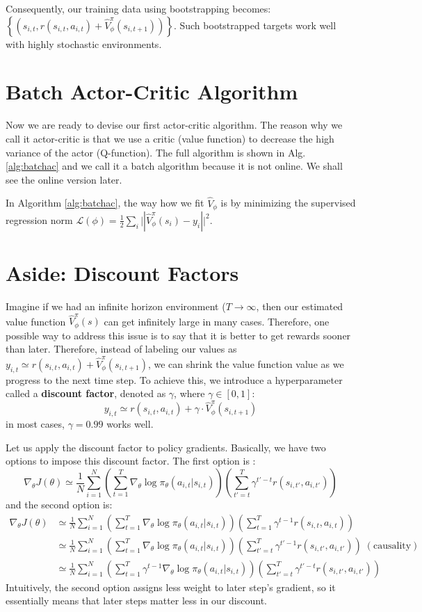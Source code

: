 Consequently, our training data using bootstrapping becomes: $\left\{(s_{i,t}, r(s_{i,t},a_{i,t}) +\hat{V}^\pi_\phi(s_{i,t+1})) \right\}$. Such bootstrapped targets work well with highly stochastic environments. 

\section{Batch Actor-Critic Algorithm}
Now we are ready to devise our first actor-critic algorithm. The reason why we call it actor-critic is that we use a critic (value function) to decrease the high variance of the actor (Q-function). The full algorithm is shown in Alg. \ref{alg:batchac} and we call it a batch algorithm because it is not online. We shall see the online version later.

In Algorithm \ref{alg:batchac}, the way how we fit $\hat{V}_\phi$ is by minimizing the supervised regression norm $\mathcal{L}(\phi) = \frac{1}{2}\sum_i\lvert|\hat{V}_\phi^\pi(s_i)-y_i|\rvert^2$.
\section{Aside: Discount Factors}
Imagine if we had an infinite horizon environment ($T\rightarrow\infty$, then our estimated value function $\hat{V}^\pi_\phi(s)$ can get infinitely large in many cases. Therefore, one possible way to address this issue is to say that it is better to get rewards sooner than later. Therefore, instead of labeling our values as $y_{i,t} \simeq r(s_{i,t}, a_{i,t}) + \hat{V}^\pi_\phi(s_{i,t+1})$, we can shrink the value function value as we progress to the next time step. To achieve this, we introduce a hyperparameter called a \textbf{discount factor}, denoted as $\gamma$, where $\gamma \in [0,1]$:
$$y_{i,t} \simeq r(s_{i,t}, a_{i,t}) + \gamma\cdot\hat{V}^\pi_\phi(s_{i,t+1})$$
in most cases, $\gamma = 0.99$ works well.

Let us apply the discount factor to policy gradients. Basically, we have two options to impose this discount factor. The first option is :
$$\nabla_\theta J(\theta) \simeq \frac{1}{N}\sum_{i=1}^N\left(\sum_{t=1}^T\nabla_\theta \log\pi_\theta(a_{i,t}|s_{i,t})\right)\left(\sum_{t'=t}^T \gamma^{t'-t}r(s_{i,t'},a_{i,t'})\right)$$
and the second option is:
$$\begin{aligned}
\nabla_\theta J(\theta) &\simeq \frac{1}{N}\sum_{i=1}^N\left(\sum_{t=1}^T\nabla_\theta \log\pi_\theta(a_{i,t}|s_{i,t})\right)\left(\sum_{t=1}^T \gamma^{t-1}r(s_{i,t},a_{i,t})\right)\\
&\simeq \frac{1}{N}\sum_{i=1}^N\left(\sum_{t=1}^T\nabla_\theta \log\pi_\theta(a_{i,t}|s_{i,t})\right)\left(\sum_{t'=t}^T \gamma^{t'-1}r(s_{i,t'},a_{i,t'})\right) \;\mathrm{(causality)}\\
&\simeq \frac{1}{N}\sum_{i=1}^N\left(\sum_{t=1}^T\gamma^{t-1}\nabla_\theta \log\pi_\theta(a_{i,t}|s_{i,t})\right)\left(\sum_{t'=t}^T \gamma^{t'-t}r(s_{i,t'},a_{i,t'})\right)
\end{aligned}$$
Intuitively, the second option assigns less weight to later step's gradient, so it essentially means that later steps matter less in our discount. 

